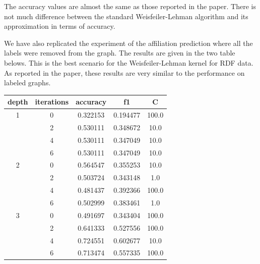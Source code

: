 \documentclass[12pt]{scrartcl}
\begin{document}
The accuracy values are almost the same as those reported in the paper. There is not much difference between the standard Weisfeiler-Lehman algorithm and its approximation in terms of accuracy.

We have also replicated the experiment of the affiliation prediction where all the labels were removed from the graph. The results are given in the two table belows. This is the best scenario for the Weisfeiler-Lehman kernel for RDF data. As reported in the paper, these results are very similar to the performance on labeled graphs.

\newpage

\begin{center}
\begin{tabular}{ccccc}
\toprule
depth & iterations & accuracy & f1 & C \\
\midrule
1 & 0 &  0.322153 &  0.194477 &  100.0 \\
  & 2 &  0.530111 &  0.348672 &   10.0 \\
  & 4 &  0.530111 &  0.347049 &   10.0 \\
  & 6 &  0.530111 &  0.347049 &   10.0 \\
\hline
2 & 0 &  0.564547 &  0.355253 &   10.0 \\
  & 2 &  0.503724 &  0.343148 &    1.0 \\
  & 4 &  0.481437 &  0.392366 &  100.0 \\
  & 6 &  0.502999 &  0.383461 &    1.0 \\
\hline
3 & 0 &  0.491697 &  0.343404 &  100.0 \\
  & 2 &  0.641333 &  0.527556 &  100.0 \\
  & 4 &  0.724551 &  0.602677 &   10.0 \\
  & 6 &  0.713474 &  0.557335 &  100.0 \\
\bottomrule
\end{tabular}
\end{center}
\end{document}
